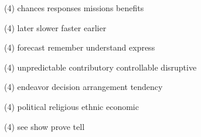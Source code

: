 \item
\begin{tasks}(4)
	\task chances
	\task responses
	\task missions
	\task benefits
\end{tasks}
\item
\begin{tasks}(4)
	\task later
	\task slower
	\task faster
	\task earlier
\end{tasks}
\item
\begin{tasks}(4)
	\task forecast
	\task remember
	\task understand
	\task express
\end{tasks}
\item
\begin{tasks}(4)
	\task unpredictable
	\task contributory
	\task controllable
	\task disruptive
\end{tasks}
\item
\begin{tasks}(4)
	\task endeavor
	\task decision
	\task arrangement
	\task tendency
\end{tasks}
\item
\begin{tasks}(4)
	\task political
	\task religious
	\task ethnic
	\task economic
\end{tasks}
\item
\begin{tasks}(4)
	\task see
	\task show
	\task prove
	\task tell
\end{tasks}